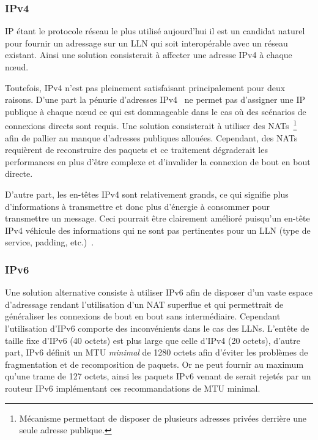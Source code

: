 \subsubsection{IPv4}
\label{gw:ipv4}

IP étant le protocole réseau le plus utilisé aujourd’hui il est un candidat naturel pour fournir un adressage sur un \ac{LLN} qui soit interopérable avec un réseau existant.
Ainsi une solution consisterait à affecter une adresse IPv4 à chaque nœud.

Toutefois, IPv4 n'est pas pleinement satisfaisant principalement pour deux raisons.
D'une part la pénurie d'adresses IPv4~\cite{deering1998internet} ne permet pas d'assigner une IP publique à chaque nœud ce qui est dommageable dans le cas où des scénarios de connexions directs sont requis.
Une solution consisterait à utiliser des \ac{NAT}s~\footnote{Mécanisme permettant de disposer de plusieurs adresses privées derrière une seule adresse publique.} afin de pallier au manque d'adresses publiques allouées.
Cependant, des \ac{NAT}s requièrent de reconstruire des paquets et ce traitement dégraderait les performances en plus d'être complexe et d'invalider la connexion de bout en bout directe.

D'autre part, les en-têtes IPv4 sont relativement grands, ce qui signifie plus d'informations à transmettre et donc plus d'énergie à consommer pour transmettre un message.
Ceci pourrait être clairement amélioré puisqu'un en-tête IPv4 véhicule des informations qui ne sont pas pertinentes pour un \ac{LLN} (type de service, padding, etc.)~\cite{shelby20116lowpan}.

\subsubsection{IPv6}
\label{gw:ipv6}

Une solution alternative consiste à utiliser IPv6 afin de disposer d'un vaste espace d'adressage rendant l'utilisation d'un \ac{NAT} superflue et qui permettrait de généraliser les connexions de bout en bout sans intermédiaire.
Cependant l'utilisation d'IPv6 comporte des inconvénients dans le cas des \ac{LLN}s.
L'entête de taille fixe d'IPv6 (40 octets) est plus large que celle d'IPv4 (20 octets), d'autre part, IPv6 définit un \ac{MTU} \emph{minimal} de 1280 octets afin d'éviter les problèmes de fragmentation et de recomposition de paquets.
Or \ieee{} ne peut fournir au maximum qu'une trame de 127 octets, ainsi les paquets IPv6 venant de \ieee{} serait rejetés par un routeur IPv6 implémentant ces recommandations de \ac{MTU} minimal.

